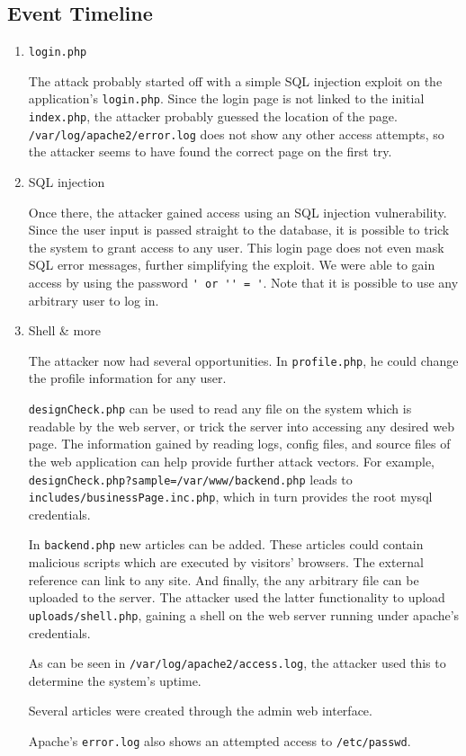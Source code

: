 \documentclass[a4paper,10pt]{article}
\begin{document}
\subsection{Event Timeline}

\begin{enumerate}
\item \verb|login.php|

The attack probably started off with a simple SQL injection exploit on the application's
\verb|login.php|. Since the login page is not linked to the initial \verb|index.php|,
the attacker probably guessed the location of the page. \verb|/var/log/apache2/error.log|
does not show any other access attempts, so the attacker seems to have found the correct
page on the first try.

\item SQL injection

Once there, the attacker gained access using an SQL injection vulnerability.
Since the user input is passed straight to the database, it is possible to
trick the system to grant access to any user. This login page does not even mask
SQL error messages, further simplifying the exploit. We were able to gain access
by using the password \verb|' or '' = '|. Note that it is possible to use any arbitrary
user to log in.

\item Shell \& more

The attacker now had several opportunities. In \verb|profile.php|, he could change
the profile information for any user.

\verb|designCheck.php| can be used to read
any file on the system which is readable by the web server, or trick the server into
accessing any desired web page. The information gained by reading logs, config files,
and source files of the web application can help provide further attack vectors.
For example, \verb|designCheck.php?sample=/var/www/backend.php| leads to \verb|includes/businessPage.inc.php|,
which in turn provides the root mysql credentials.

In \verb|backend.php| new articles can be added.
These articles could contain malicious scripts which are executed by visitors' browsers.
The external reference can link to any site. And finally, the any arbitrary file
can be uploaded to the server. The attacker used the latter functionality to upload
\verb|uploads/shell.php|, gaining a shell on the web server running under apache's credentials.

As can be seen in \verb|/var/log/apache2/access.log|, the attacker used this to determine
the system's uptime.

Several articles were created through the admin web interface.

Apache's \verb|error.log| also shows an attempted access to \verb|/etc/passwd|.

\end{enumerate}
\end{document}
